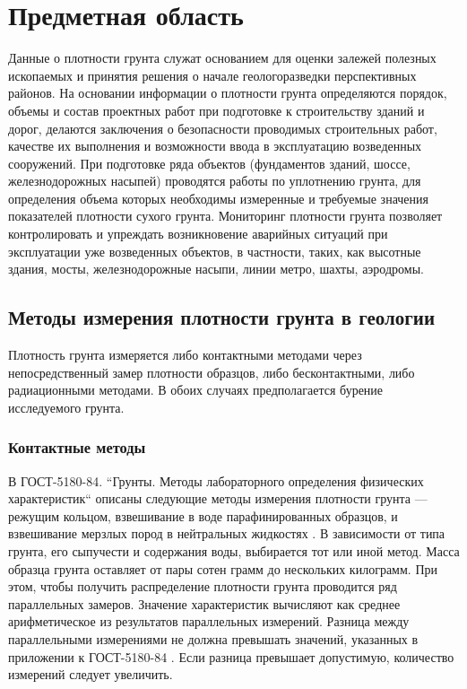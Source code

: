 \chapter{Предметная область} \label{chapt1}
Данные о плотности грунта служат основанием для оценки залежей полезных ископаемых 
и принятия решения о начале геологоразведки перспективных районов. На основании  информации о плотности грунта 
определяются порядок, объемы и состав проектных работ при подготовке к строительству зданий и дорог, делаются заключения о безопасности проводимых 
строительных работ, качестве их выполнения и возможности ввода в эксплуатацию возведенных сооружений. При подготовке ряда объектов 
(фундаментов зданий, шоссе, железнодорожных насыпей) проводятся 
работы по уплотнению грунта, для определения объема которых необходимы измеренные и требуемые значения показателей плотности сухого грунта.
Мониторинг плотности грунта позволяет контролировать и упреждать возникновение аварийных ситуаций при эксплуатации уже возведенных объектов, 
в частности, таких, как высотные здания, мосты, железнодорожные насыпи, линии метро, шахты, аэродромы.


\section{Методы измерения плотности грунта в геологии} \label{sect1_1}

Плотность грунта измеряется либо контактными методами через непосредственный замер плотности образцов, 
либо бесконтактными, либо радиационными методами. 
В обоих случаях предполагается бурение исследуемого грунта. 

\subsection{Контактные методы}\label{subsect1_1_1}

В ГОСТ-5180-84. ``Грунты. Методы лабораторного определения физических характеристик`` описаны следующие 
методы измерения плотности грунта --- режущим кольцом, взвешивание в воде парафинированных образцов, и 
взвешивание мерзлых пород в нейтральных жидкостях . В зависимости от типа грунта, его сыпучести и содержания воды,
выбирается тот или иной метод. Масса образца грунта оставляет от пары сотен грамм до нескольких килограмм. При этом, чтобы получить 
распределение плотности грунта проводится ряд параллельных замеров. Значение характеристик вычисляют как 
среднее арифметическое из результатов параллельных измерений. 
Разница между параллельными измерениями не должна превышать значений, указанных в приложении к ГОСТ-5180-84 \cite{gost5180}. 
Если разница превышает допустимую, количество измерений следует увеличить.

